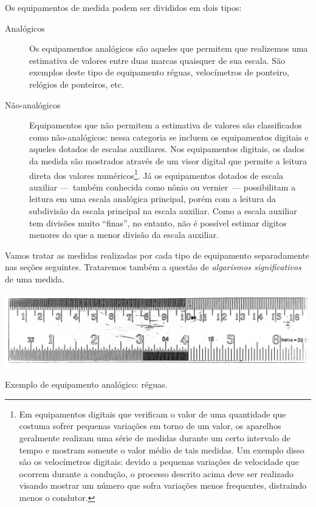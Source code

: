 Os equipamentos de medida podem ser divididos em dois tipos:
\begin{description}
	\item[Analógicos] Os equipamentos analógicos são aqueles que permitem que realizemos uma estimativa de valores entre duas marcas quaisquer de sua escala. São exemplos deste tipo de equipamento réguas, velocímetros de ponteiro, relógios de ponteiros, etc.

	\item[Não-analógicos] Equipamentos que não permitem a estimativa de valores são classificados como não-analógicos: nessa categoria se incluem os equipamentos digitais e aqueles dotados de escalas auxiliares. Nos equipamentos digitais, os dados da medida são mostrados através de um visor digital que permite a leitura direta dos valores numéricos\footnote[][-6cm]{Em equipamentos digitais que verificam o valor de uma quantidade que costuma sofrer pequenas variações em torno de um valor, os aparelhos geralmente realizam uma série de medidas durante um certo intervalo de tempo e mostram somente o valor médio de tais medidas. Um exemplo disso são os velocímetros digitais: devido a pequenas variações de velocidade que ocorrem durante a condução, o processo descrito acima deve ser realizado visando mostrar um número que sofra variações menos frequentes, distraindo menos o condutor.}. Já os equipamentos dotados de escala auxiliar ---~também conhecida como nônio ou vernier~--- possibilitam a leitura em uma escala analógica principal, porém com a leitura da subdivisão da escala principal na escala auxiliar. Como a escala auxiliar tem divisões muito ``finas'', no entanto, não é possível estimar digitos menores do que a menor divisão da escala auxiliar.
\end{description}
%
Vamos tratar as medidas realizadas por cada tipo de equipamento separadamente nas seções seguintes. Trataremos também a questão de \emph{algarismos significativos} de uma medida.
\begin{marginfigure}[-3cm]
	\includegraphics[width=\textwidth]{Ilustrations/Regua.png}
	\caption{Exemplo de equipamento analógico: réguas.}
\end{marginfigure}
%
